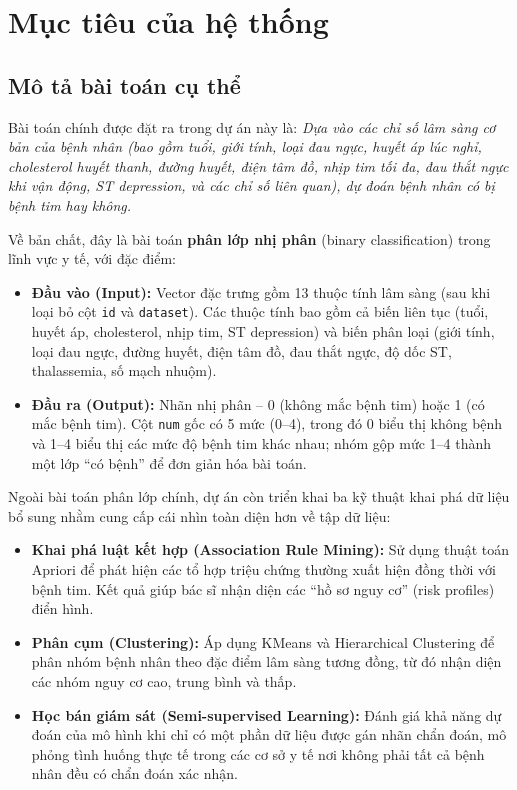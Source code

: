 \section{Mục tiêu của hệ thống}

\subsection{Mô tả bài toán cụ thể}

Bài toán chính được đặt ra trong dự án này là: \textit{Dựa vào các chỉ số lâm sàng cơ bản của bệnh nhân (bao gồm tuổi, giới tính, loại đau ngực, huyết áp lúc nghỉ, cholesterol huyết thanh, đường huyết, điện tâm đồ, nhịp tim tối đa, đau thắt ngực khi vận động, ST depression, và các chỉ số liên quan), dự đoán bệnh nhân có bị bệnh tim hay không.}

Về bản chất, đây là bài toán \textbf{phân lớp nhị phân} (binary classification) trong lĩnh vực y tế, với đặc điểm:
\begin{itemize}
    \item \textbf{Đầu vào (Input):} Vector đặc trưng gồm 13 thuộc tính lâm sàng (sau khi loại bỏ cột \texttt{id} và \texttt{dataset}). Các thuộc tính bao gồm cả biến liên tục (tuổi, huyết áp, cholesterol, nhịp tim, ST depression) và biến phân loại (giới tính, loại đau ngực, đường huyết, điện tâm đồ, đau thắt ngực, độ dốc ST, thalassemia, số mạch nhuộm).
    \item \textbf{Đầu ra (Output):} Nhãn nhị phân -- 0 (không mắc bệnh tim) hoặc 1 (có mắc bệnh tim). Cột \texttt{num} gốc có 5 mức (0--4), trong đó 0 biểu thị không bệnh và 1--4 biểu thị các mức độ bệnh tim khác nhau; nhóm gộp mức 1--4 thành một lớp ``có bệnh'' để đơn giản hóa bài toán.
\end{itemize}

Ngoài bài toán phân lớp chính, dự án còn triển khai ba kỹ thuật khai phá dữ liệu bổ sung nhằm cung cấp cái nhìn toàn diện hơn về tập dữ liệu:
\begin{itemize}
    \item \textbf{Khai phá luật kết hợp (Association Rule Mining):} Sử dụng thuật toán Apriori để phát hiện các tổ hợp triệu chứng thường xuất hiện đồng thời với bệnh tim. Kết quả giúp bác sĩ nhận diện các ``hồ sơ nguy cơ'' (risk profiles) điển hình.
    \item \textbf{Phân cụm (Clustering):} Áp dụng KMeans và Hierarchical Clustering để phân nhóm bệnh nhân theo đặc điểm lâm sàng tương đồng, từ đó nhận diện các nhóm nguy cơ cao, trung bình và thấp.
    \item \textbf{Học bán giám sát (Semi-supervised Learning):} Đánh giá khả năng dự đoán của mô hình khi chỉ có một phần dữ liệu được gán nhãn chẩn đoán, mô phỏng tình huống thực tế trong các cơ sở y tế nơi không phải tất cả bệnh nhân đều có chẩn đoán xác nhận.
\end{itemize}

